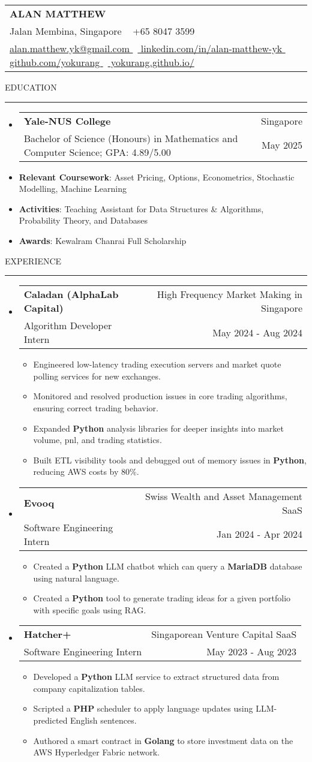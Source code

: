 \documentclass[letterpaper, 11pt]{article}
\makeatletter
\def\sectionlineskip{\medskip}
\def\sectionskip{\medskip}
\def\namesize{\LARGE}
\newcommand{\ResumeHeader}[6]{
  \noindent
  \begin{tabularx}{\textwidth}{>{\centering\arraybackslash}X}
    \namesize\MakeUppercase{\textbf{\fullname}} \\
    #1 \textbar\ #2 \\
    #3 \textbar\ #4 \textbar\ #5 \textbar\ #6 \\
  \end{tabularx}
}
\def \fullname { Alan Matthew }
\def \linkedinlink { https://www.linkedin.com/in/alan-matthew-yk }
\def \linkedintext { linkedin.com/in/alan-matthew-yk }
\def \phonenumber { +65 8047 3599 }
\def \githublink { https://github.com/yokurang }
\def \githubtext { github.com/yokurang }
\def \emaillink { mailto:alan.matthew.yk@gmail.com }
\def \emailtext { alan.matthew.yk@gmail.com }
\def \websitelink { https://yokurang.github.io/ }
\def \websitetext { yokurang.github.io/ }
\def \address { 9 Jalan Membina, Singapore }
\def \headertype {\ResumeHeader}
\def \linkedin {\href{\linkedinlink}{\linkedintext}}
\def \phone {{\phonenumber}}
\def \email {\href{\emaillink}{\emailtext}}
\def \github {\href{\githublink}{\githubtext}}
\def \website {\href{\websitelink}{\websitetext}}
\newcommand{\SectionHeading}[1]{
  \sectionskip
  \raggedright\raggedbottom\MakeUppercase{\large{#1}}
  \sectionlineskip
  \hrule
  \color{black}
}
\newcommand{\ResumeEntryTSDL}[4]{
  \vspace{1pt}\item
    \begin{tabular*}{\textwidth}[t]{l@{\extracolsep{\fill}}r} 
      \textbf{#1} & #2 \\
      #3 & #4 \\
    \end{tabular*}\vspace{-2.835pt} %
}
\newcommand{\ResumeItem}[2]{
  \item{
    \textbf{#1}{: #2 \vspace{-2.835pt}}
  }
}
\newcommand{\ResumeItemDefault}[1]{
  \item{
    #1 \vspace{-2.835pt}
  }
}
\newcommand{\ResumeSubItem}[2]{\ResumeItem{#1}{#2}\vspace{-2.835pt}}
\newcommand{\ResumeEntryStart}{\begin{itemize}[leftmargin=0mm, label={}]}
\newcommand{\ResumeEntryEnd}{\end{itemize}\vspace{-2.835pt}} %
\newcommand{\ResumeItemListStart}{\begin{itemize}[leftmargin=5mm, label=$\bullet$, itemsep=1mm, parsep=1mm]} %
\newcommand{\ResumeItemListEnd}{\end{itemize}}
\makeatother
\begin{document}
  \headertype{\address}{\phone}{\email}{\linkedin}{\github}{\website}
  
  \SectionHeading{Education}
  \ResumeEntryStart
    \ResumeEntryTSDL{Yale-NUS College} {Singapore}
    {Bachelor of Science (Honours) in Mathematics and Computer Science; GPA: 4.89/5.00} {May 2025}
    \ResumeSubItem{Relevant Coursework}{Asset Pricing, Options, Econometrics, Stochastic Modelling, Machine Learning}
    \ResumeSubItem{Activities}{Teaching Assistant for Data Structures \& Algorithms, Probability Theory, and Databases}
    \ResumeSubItem{Awards}{Kewalram Chanrai Full Scholarship}
  \ResumeEntryEnd

  \vspace{5pt}

  \SectionHeading{Experience}

  \ResumeEntryStart
  \ResumeEntryTSDL{Caladan (AlphaLab Capital)}{High Frequency Market Making in Singapore}{Algorithm Developer Intern}{May 2024 - Aug 2024}
  \ResumeItemListStart
  \ResumeItemDefault{Engineered low-latency trading execution servers and market quote polling services for new exchanges.}
  \ResumeItemDefault{Monitored and resolved production issues in core trading algorithms, ensuring correct trading behavior.}
  \ResumeItemDefault{Expanded \textbf{Python} analysis libraries for deeper insights into market volume, pnl, and trading statistics.}
  \ResumeItemDefault{Built ETL visibility tools and debugged out of memory issues in \textbf{Python}, reducing AWS costs by 80\%.}
  \ResumeItemListEnd
  \ResumeEntryEnd

  \ResumeEntryStart
    \ResumeEntryTSDL{Evooq}{Swiss Wealth and Asset Management SaaS}{Software Engineering Intern}{Jan 2024 - Apr 2024}
    \ResumeItemListStart
    \ResumeItemDefault{Created a \textbf{Python} LLM chatbot which can query a \textbf{MariaDB} database using natural language.}
    \ResumeItemDefault{Created a \textbf{Python} tool to generate trading ideas for a given portfolio with specific goals using RAG.}
    \ResumeItemListEnd
  \ResumeEntryEnd

  \ResumeEntryStart
    \ResumeEntryTSDL{Hatcher+}{Singaporean Venture Capital SaaS}{Software Engineering Intern}{May 2023 - Aug 2023}
    \ResumeItemListStart
      \ResumeItemDefault{Developed a \textbf{Python} LLM service to extract structured data from company capitalization tables.}
      \ResumeItemDefault{Scripted a \textbf{PHP} scheduler to apply language updates using LLM-predicted English sentences.}
      \ResumeItemDefault{Authored a smart contract in \textbf{Golang} to store investment data on the AWS Hyperledger Fabric network.}
    \ResumeItemListEnd
  \ResumeEntryEnd
\end{document}
